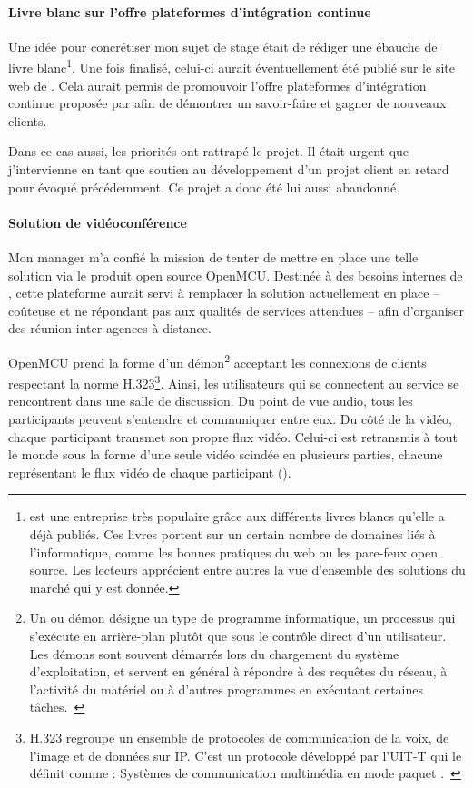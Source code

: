 \paragraph{Livre blanc sur l'offre \og plateformes d'intégration continue \fg}
Une idée pour concrétiser mon sujet de stage était de rédiger une ébauche de livre blanc\footnote{\asmile{} est une entreprise très populaire grâce aux différents livres blancs qu'elle a déjà publiés. Ces livres portent sur un certain nombre de domaines liés à l'informatique, comme les bonnes pratiques du web ou les pare-feux open source. Les lecteurs apprécient entre autres la vue d'ensemble des solutions du marché qui y est donnée.}.
Une fois finalisé, celui-ci aurait éventuellement été publié sur le site web de \asmile.
Cela aurait permis de promouvoir l'offre \og plateformes d'intégration continue \fg{} proposée par \asmile{} afin de démontrer un savoir-faire et gagner de nouveaux clients.

Dans ce cas aussi, les priorités ont rattrapé le projet.
Il était urgent que j'intervienne en tant que soutien au développement d'un projet client en retard pour \abt{} évoqué précédemment.
Ce projet a donc été lui aussi abandonné.

\paragraph{Solution de vidéoconférence}
Mon manager \apakou{} m'a confié la mission de tenter de mettre en place une telle solution via le produit open source OpenMCU.
Destinée à des besoins internes de \asmile, cette plateforme aurait servi à remplacer la solution actuellement en place -- coûteuse et ne répondant pas aux qualités de services attendues -- afin d'organiser des réunion inter-agences à distance.

OpenMCU prend la forme d'un démon\footnote{Un  ou démon désigne un type de programme informatique, un processus qui s'exécute en arrière-plan plutôt que sous le contrôle direct d'un utilisateur. Les démons sont souvent démarrés lors du chargement du système d'exploitation, et servent en général à répondre à des requêtes du réseau, à l'activité du matériel ou à d'autres programmes en exécutant certaines tâches.~\cite{demon}} acceptant les connexions de clients respectant la norme H.323\footnote{H.323 regroupe un ensemble de protocoles de communication de la voix, de l'image et de données sur IP. C'est un protocole développé par l'UIT-T qui le définit comme : \og Systèmes de communication multimédia en mode paquet \fg.~\cite{h323}}.
Ainsi, les utilisateurs qui se connectent au service se rencontrent dans une salle de discussion.
Du point de vue audio, tous les participants peuvent s'entendre et communiquer entre eux.
Du côté de la vidéo, chaque participant transmet son propre flux vidéo. Celui-ci est retransmis à tout le monde sous la forme d'une seule vidéo scindée en plusieurs parties, chacune représentant le flux vidéo de chaque participant ().

